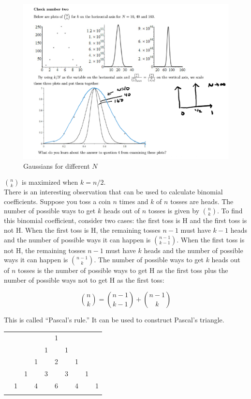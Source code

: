 \begin{figure}[H]
	\centering
	\includegraphics[width=160mm]{1.png}
	\caption{Gaussians for different $N$}
\end{figure}

$\binom{n}{k}$ is maximized when $k=n/2$. \\

There is an interesting observation that can be used to calculate binomial coefficients. Suppose you toss a coin $n$ times and $k$ of $n$ tosses are heads. The number of possible ways to get $k$ heads out of $n$ tosses is given by $\binom{n}{k}$. To find this binomial coefficient, consider two cases: the first toss is H and the first toss is not H. When the first toss is H, the remaining tosses $n-1$ must have $k-1$ heads and the number of possible ways it can happen is $\binom{n-1}{k-1}$. When the first toss is not H,  the remaining tosses $n-1$ must have $k$ heads and the number of possible ways it can happen is $\binom{n-1}{k}$. The number of possible ways to get $k$ heads out of $n$ tosses is the number of possible ways to get H as the first toss plus the number of possible ways not to get H as the first toss:

$$\binom{n}{k} = \binom{n-1}{k-1} + \binom{n-1}{k}$$

This is called ``Pascal's rule.'' It can be used to construct Pascal's triangle.

\begin{center}
	\begin{tabular}{rccccccccc}
		&    &    &    &    &  1\\\noalign{\smallskip\smallskip}
		&    &    &    &  1 &    &  1\\\noalign{\smallskip\smallskip}
		&    &    &  1 &    &  2 &    &  1\\\noalign{\smallskip\smallskip}
		&    &  1 &    &  3 &    &  3 &    &  1\\\noalign{\smallskip\smallskip}
		&  1 &    &  4 &    &  6 &    &  4 &    &  1\\\noalign{\smallskip\smallskip}
	\end{tabular}
\end{center}


